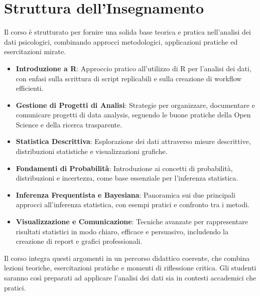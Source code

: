 \documentclass[
  letterpaper,
]{krantz}
\providecommand{\tightlist}{%
  \setlength{\itemsep}{0pt}\setlength{\parskip}{0pt}}\usepackage{longtable,booktabs,array}
\begin{document}
\section*{Struttura dell'Insegnamento}\label{struttura-dellinsegnamento}


Il corso è strutturato per fornire una solida base teorica e pratica
nell'analisi dei dati psicologici, combinando approcci metodologici,
applicazioni pratiche ed esercitazioni mirate.

\begin{itemize}
\tightlist
\item
  \textbf{Introduzione a R}: Approccio pratico all'utilizzo di R per
  l'analisi dei dati, con enfasi sulla scrittura di script replicabili e
  sulla creazione di workflow efficienti.\\
\item
  \textbf{Gestione di Progetti di Analisi}: Strategie per organizzare,
  documentare e comunicare progetti di data analysis, seguendo le buone
  pratiche della Open Science e della ricerca trasparente.\\
\item
  \textbf{Statistica Descrittiva}: Esplorazione dei dati attraverso
  misure descrittive, distribuzioni statistiche e visualizzazioni
  grafiche.\\
\item
  \textbf{Fondamenti di Probabilità}: Introduzione ai concetti di
  probabilità, distribuzioni e incertezza, come base essenziale per
  l'inferenza statistica.\\
\item
  \textbf{Inferenza Frequentista e Bayesiana}: Panoramica sui due
  principali approcci all'inferenza statistica, con esempi pratici e
  confronto tra i metodi.\\
\item
  \textbf{Visualizzazione e Comunicazione}: Tecniche avanzate per
  rappresentare risultati statistici in modo chiaro, efficace e
  persuasivo, includendo la creazione di report e grafici professionali.
\end{itemize}

Il corso integra questi argomenti in un percorso didattico coerente, che
combina lezioni teoriche, esercitazioni pratiche e momenti di
riflessione critica. Gli studenti saranno così preparati ad applicare
l'analisi dei dati sia in contesti accademici che pratici.
\end{document}

